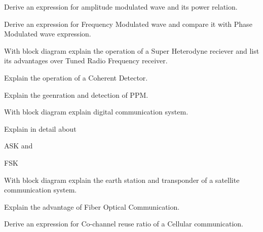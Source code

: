 \markB

\partCo


\item \iitem Derive an expression for amplitude modulated wave and its power relation.

\Or

\item Derive an expression for Frequency Modulated wave and compare it with
      Phase Modulated wave expression.

\ene

\newpage
\again

\item \iitem With block diagram explain the operation of a Super Heterodyne reciever and 
  list its advantages over Tuned Radio Frequency receiver.

\Or

\item \iitem Explain the operation of a Coherent Detector.

\item Explain the geenration and detection of PPM.

\ene
\ene

\item \iitem With block diagram explain digital communication system.

\Or

\item Explain in detail about 

\iitem ASK and 
\item FSK

\ene
\ene

\item \iitem With block diagram explain the earth station and transponder of a 
  satellite communication system.

\Or

\item \iitem Explain the advantage of Fiber Optical Communication.

\item Derive an expression for Co-channel reuse ratio of a Cellular communication.

\ene
\ene
\markC
\ene
